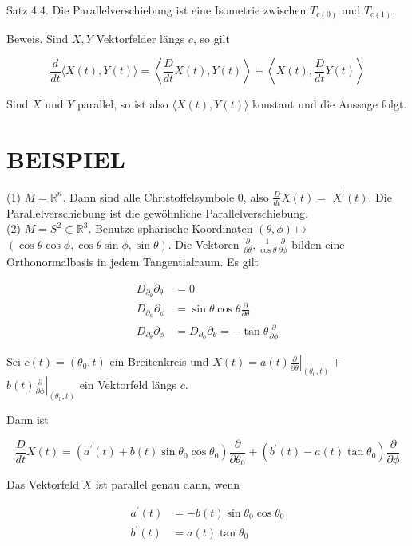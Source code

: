 \documentclass[10pt, letterpaper]{article}
\begin{document}
Satz 4.4. Die Parallelverschiebung ist eine Isometrie zwischen $T_{c(0)}$ und $T_{c(1)}$.

Beweis. Sind $X, Y$ Vektorfelder längs $c$, so gilt

$$
\frac{d}{d t}\langle X(t), Y(t)\rangle=\left\langle\frac{D}{d t} X(t), Y(t)\right\rangle+\left\langle X(t), \frac{D}{d t} Y(t)\right\rangle
$$

Sind $X$ und $Y$ parallel, so ist also $\langle X(t), Y(t)\rangle$ konstant und die Aussage folgt.

\section*{BEISPIEL}
(1) $M=\mathbb{R}^{n}$. Dann sind alle Christoffelsymbole 0, also $\frac{D}{d t} X(t)=$ $X^{\prime}(t)$. Die Parallelverschiebung ist die gewöhnliche Parallelverschiebung.\\
(2) $M=S^{2} \subset \mathbb{R}^{3}$. Benutze sphärische Koordinaten $(\theta, \phi) \mapsto$ $(\cos \theta \cos \phi, \cos \theta \sin \phi, \sin \theta)$. Die Vektoren $\frac{\partial}{\partial \theta}, \frac{1}{\cos \theta} \frac{\partial}{\partial \phi}$ bilden eine Orthonormalbasis in jedem Tangentialraum. Es gilt

$$
\begin{aligned}
D_{\partial_{\theta}} \partial_{\theta} & =0 \\
D_{\partial_{\phi}} \partial_{\phi} & =\sin \theta \cos \theta \frac{\partial}{\partial \theta} \\
D_{\partial_{\theta}} \partial_{\phi} & =D_{\partial_{\phi}} \partial_{\theta}=-\tan \theta \frac{\partial}{\partial \phi}
\end{aligned}
$$

Sei $c(t)=\left(\theta_{0}, t\right)$ ein Breitenkreis und $X(t)=\left.a(t) \frac{\partial}{\partial \theta}\right|_{\left(\theta_{0}, t\right)}+$ $\left.b(t) \frac{\partial}{\partial \phi}\right|_{\left(\theta_{0}, t\right)}$ ein Vektorfeld längs $c$.

Dann ist

$$
\frac{D}{d t} X(t)=\left(a^{\prime}(t)+b(t) \sin \theta_{0} \cos \theta_{0}\right) \frac{\partial}{\partial \theta_{0}}+\left(b^{\prime}(t)-a(t) \tan \theta_{0}\right) \frac{\partial}{\partial \phi}
$$

Das Vektorfeld $X$ ist parallel genau dann, wenn

$$
\begin{aligned}
a^{\prime}(t) & =-b(t) \sin \theta_{0} \cos \theta_{0} \\
b^{\prime}(t) & =a(t) \tan \theta_{0}
\end{aligned}
$$
\end{document}

